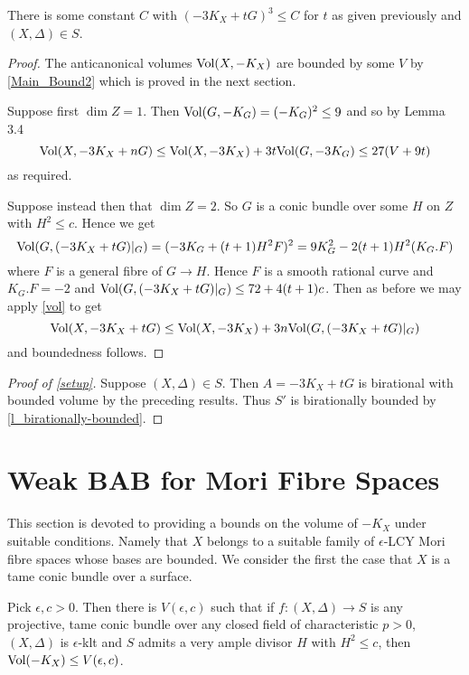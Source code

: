 \begin{lemma}
	There is some constant $C$ with $(-3K_{X}+tG)^{3} \leq C$ for $t$ as given previously and $(X,\Delta)\in S$.
\end{lemma}

\begin{proof}
	The anticanonical volumes $\text{Vol}(X,-K_{X})$ are bounded by some $V$ by \autoref{Main_Bound2} which is proved in the next section.
	
	Suppose first $\dim Z=1$. Then $\text{Vol}(G,-K_{G})=(-K_{G})^{2} \leq 9$ and so by Lemma 3.4
	\[\text{Vol}(X,-3K_{X}+nG) \leq \text{Vol}(X,-3K_{X}) + 3t\text{Vol}(G,-3K_{G})\leq 27(V+9t)\]
	as required.
	
	Suppose instead then that $\dim Z=2$. So $G$ is a conic bundle over some $H$ on $Z$ with $H^{2} \leq c$. Hence we get
	\[\text{Vol}(G,(-3K_{X}+tG)|_{G})= (-3K_{G}+(t+1)H^{2}F)^{2}=9K_{G}^{2}-2(t+1)H^{2}(K_{G}.F)\]
	where $F$ is a general fibre of $G \to H$. Hence $F$ is a smooth rational curve and $K_{G}.F=-2$ and $\text{Vol}(G,(-3K_{X}+tG)|_{G})\leq 72+4(t+1)c$. Then as before we may apply \autoref{vol} to get 
	\[\text{Vol}(X,-3K_{X}+tG) \leq \text{Vol}(X,-3K_{X}) + 3n\text{Vol}(G,(-3K_{X}+tG)|_{G})\]
	and boundedness follows.
\end{proof}

\begin{proof}[Proof of \autoref{setup}]
	Suppose $(X,\Delta) \in S$. Then $A=-3K_{X}+tG$ is birational with bounded volume by the preceding results. Thus $S'$ is birationally bounded by \autoref{l_birationally-bounded}.
\end{proof}

\section{Weak BAB for Mori Fibre Spaces}
This section is devoted to providing a bounds on the volume of $-K_{X}$ under suitable conditions. Namely that $X$ belongs to a suitable family of $\epsilon$-LCY Mori fibre spaces whose bases are bounded. We consider the first the case that $X$ is a tame conic bundle over a surface.

\begin{theorem}\label{J1}
	Pick $\epsilon,c >0$. Then there is $V(\epsilon,c)$ such that if $f\colon (X,\Delta) \to S$ is any projective, tame conic bundle over any closed field of characteristic $p> 0$, $(X,\Delta)$ is $\epsilon$-klt and $S$ admits a very ample divisor $H$ with $H^{2} \leq c$, then $\text{Vol}(-K_{X}) \leq V(\epsilon,c)$. 
\end{theorem}

